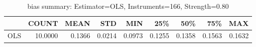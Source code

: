 \begin{table}[ht]
\centering
\caption{bias summary: Estimator=OLS, Instruments=166, Strength=0.80}
\begin{tabular}{lrrrrrrrr}
\toprule
 & COUNT & MEAN & STD & MIN & 25\% & 50\% & 75\% & MAX \\
\midrule
OLS & 10.0000 & 0.1366 & 0.0214 & 0.0973 & 0.1255 & 0.1358 & 0.1563 & 0.1632 \\
\bottomrule
\end{tabular}
\end{table}
